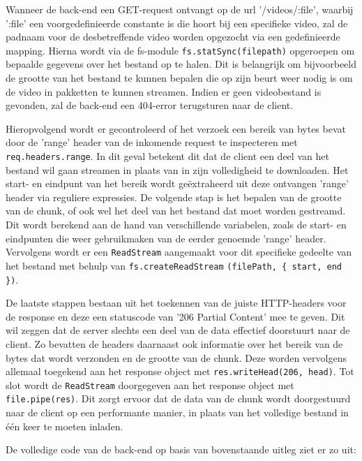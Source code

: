 Wanneer de back-end een GET-request ontvangt op de url '/videos/:file', waarbij ':file' een voorgedefinieerde constante is die hoort bij een specifieke video, zal de padnaam voor de desbetreffende video worden opgezocht via een gedefinieerde mapping. Hierna wordt via de fs-module \verb|fs.statSync(filepath)| opgeroepen om bepaalde gegevens over het bestand op te halen. Dit is belangrijk om bijvoorbeeld de grootte van het bestand te kunnen bepalen die op zijn beurt weer nodig is om de video in pakketten te kunnen streamen. Indien er geen videobestand is gevonden, zal de back-end een 404-error terugsturen naar de client.

Hieropvolgend wordt er gecontroleerd of het verzoek een bereik van bytes bevat door de 'range' header van de inkomende request te inspecteren met \verb|req.headers.range|. In dit geval betekent dit dat de client een deel van het bestand wil gaan streamen in plaats van in zijn volledigheid te downloaden. Het start- en eindpunt van het bereik wordt geëxtraheerd uit deze ontvangen 'range' header via reguliere expressies. De volgende stap is het bepalen van de grootte van de chunk, of ook wel het deel van het bestand dat moet worden gestreamd. Dit wordt berekend aan de hand van verschillende variabelen, zoals de start- en eindpunten die weer gebruikmaken van de eerder genoemde 'range' header. Vervolgens wordt er een \verb|ReadStream|  aangemaakt voor dit specifieke gedeelte van het bestand met behulp van \verb|fs.createReadStream| \verb|(filePath, |\verb|{ start, end })|.

De laatste stappen bestaan uit het toekennen van de juiste HTTP-headers voor de response en deze een statuscode van '206 Partial Content' mee te geven. Dit wil zeggen dat de server slechts een deel van de data effectief doorstuurt naar de client. Zo bevatten de headers daarnaast ook informatie over het bereik van de bytes dat wordt verzonden en de grootte van de chunk. Deze worden vervolgens allemaal toegekend aan het response object met \verb|res.writeHead(206, head)|. Tot slot wordt de \verb|ReadStream| doorgegeven aan het response object met \verb|file.pipe(res)|. Dit zorgt ervoor dat de data van de chunk wordt doorgestuurd naar de client op een performante manier, in plaats van het volledige bestand in één keer te moeten inladen.

De volledige code van de back-end op basis van bovenstaande uitleg ziet er zo uit:

